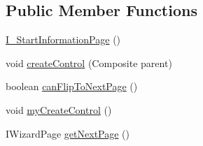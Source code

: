 \subsection*{Public Member Functions}
\begin{DoxyCompactItemize}
\item 
\hyperlink{classit_1_1isislab_1_1masonassisteddocumentation_1_1mason_1_1wizards_1_1_i___start_information_page_a51f37c7e6f803205cd4c5dc86723b9de}{I\-\_\-\-Start\-Information\-Page} ()
\item 
void \hyperlink{classit_1_1isislab_1_1masonassisteddocumentation_1_1mason_1_1wizards_1_1_i___start_information_page_aa4c72a1ff6ff722f6c7eda3a73c395ad}{create\-Control} (Composite parent)
\item 
boolean \hyperlink{classit_1_1isislab_1_1masonassisteddocumentation_1_1mason_1_1wizards_1_1_i___start_information_page_afb79686f7ac3ced2797e267df73dd85c}{can\-Flip\-To\-Next\-Page} ()
\item 
void \hyperlink{classit_1_1isislab_1_1masonassisteddocumentation_1_1mason_1_1wizards_1_1_i___start_information_page_ae0a18d33050e71d0c590f8da3f4a3390}{my\-Create\-Control} ()
\item 
I\-Wizard\-Page \hyperlink{classit_1_1isislab_1_1masonassisteddocumentation_1_1mason_1_1wizards_1_1_i___start_information_page_a8323956a74dd2d72499c515fa1fc04f7}{get\-Next\-Page} ()
\end{DoxyCompactItemize}
